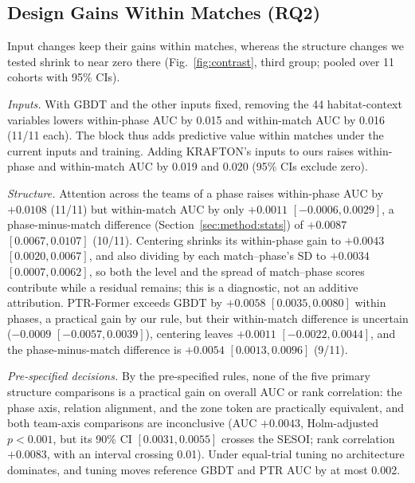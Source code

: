 \documentclass[sigconf,anonymous]{acmart}
\begin{document}
\subsection{Design Gains Within Matches (RQ2)}
\label{sec:results:inputs}
Input changes keep their gains within matches, whereas the structure changes we tested shrink to near zero there (Fig.~\ref{fig:contrast}, third group; pooled over 11 cohorts with 95\% CIs).

\emph{Inputs.} With GBDT and the other inputs fixed, removing the 44 habitat-context variables lowers within-phase AUC by 0.015 and within-match AUC by 0.016 (11/11 each). The block thus adds predictive value within matches under the current inputs and training. Adding KRAFTON's inputs to ours raises within-phase and within-match AUC by 0.019 and 0.020 (95\% CIs exclude zero).

\emph{Structure.} Attention across the teams of a phase raises within-phase AUC by $+0.0108$ (11/11) but within-match AUC by only $+0.0011$ $[-0.0006,\allowbreak 0.0029]$, a phase-minus-match difference (Section~\ref{sec:method:stats}) of $+0.0087$ $[0.0067,\allowbreak 0.0107]$ (10/11). Centering shrinks its within-phase gain to $+0.0043$ $[0.0020,\allowbreak 0.0067]$, and also dividing by each match--phase's SD to $+0.0034$ $[0.0007,\allowbreak 0.0062]$, so both the level and the spread of match--phase scores contribute while a residual remains; this is a diagnostic, not an additive attribution. PTR-Former exceeds GBDT by $+0.0058$ $[0.0035,\allowbreak 0.0080]$ within phases, a practical gain by our rule, but their within-match difference is uncertain ($-0.0009$ $[-0.0057,\allowbreak 0.0039]$), centering leaves $+0.0011$ $[-0.0022,\allowbreak 0.0044]$, and the phase-minus-match difference is $+0.0054$ $[0.0013,\allowbreak 0.0096]$ (9/11).

\emph{Pre-specified decisions.} By the pre-specified rules, none of the five primary structure comparisons is a practical gain on overall AUC or rank correlation: the phase axis, relation alignment, and the zone token are practically equivalent, and both team-axis comparisons are inconclusive (AUC $+0.0043$, Holm-adjusted $p<0.001$, but its 90\% CI $[0.0031,\allowbreak 0.0055]$ crosses the SESOI; rank correlation $+0.0083$, with an interval crossing 0.01). Under equal-trial tuning no architecture dominates, and tuning moves reference GBDT and PTR AUC by at most 0.002.
\end{document}
